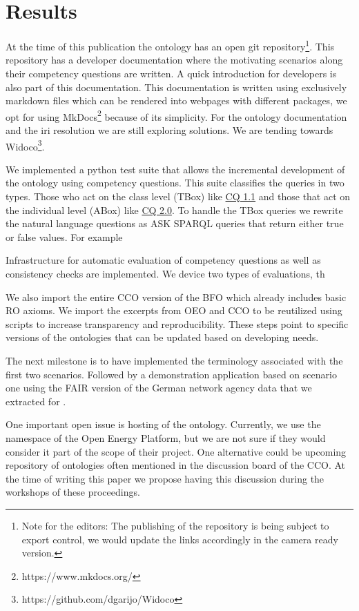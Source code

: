 \section{Results}
\label{results}

At the time of this publication the ontology has an open git
repository\footnote{Note for the editors: The publishing of the repository is
being subject to export control, we would update the links accordingly in the
camera ready version. }. This repository has a developer documentation where the
motivating scenarios along their competency questions are written. A quick
introduction for developers is also part of this documentation. This
documentation is written using exclusively markdown files which can be rendered
into webpages with different packages, we opt for using
MkDocs\footnote{https://www.mkdocs.org/} because of its simplicity. For the
ontology documentation and the iri resolution we are still exploring solutions.
We are tending towards Widoco\footnote{https://github.com/dgarijo/Widoco}.

We implemented a python test suite that allows the incremental development of
the ontology using competency questions. This suite classifies the queries in
two types. Those who act on the class level (TBox) like \hyperref[CQ1.1]{CQ 1.1}
and those that act on the individual level (ABox) like \hyperref[CQ2.0]{CQ 2.0}.
To handle the TBox queries we rewrite the natural language questions as ASK
SPARQL queries that return either true or false values. For example 

Infrastructure
for automatic evaluation of competency questions as well as consistency checks
are implemented. We device two types of evaluations, th


We also import the entire CCO version of the BFO which already
includes basic RO axioms. We import  the excerpts from OEO and CCO to be
reutilized using scripts to increase transparency and reproducibility. These
steps point to specific versions of the ontologies that can be updated based on
developing needs. 

The next milestone is to have implemented the terminology associated with the
first two scenarios. Followed by a demonstration application based on scenario
one using the FAIR version of the German network agency data that we extracted
for \cite{ArellanoRuiz.2024}.

One important open issue is hosting of the ontology. Currently, we use the
namespace of the Open Energy Platform, but we are not sure if they would
consider it part of the scope of their project. One alternative could be
upcoming repository of ontologies often mentioned in the discussion board of
the CCO. At the time of writing this paper we propose having this discussion
during the workshops of these proceedings.